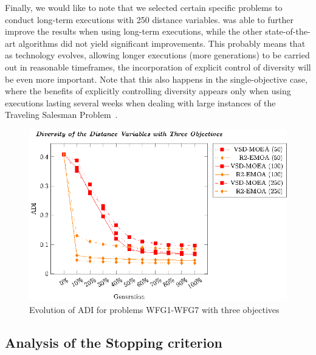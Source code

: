 Finally, we would like to note that we selected certain specific problems to conduct long-term executions with 250 distance variables.
%
\VSDMOEA{} was able to further improve the results when using long-term executions, while the other state-of-the-art algorithms did not yield significant improvements.
%
This probably means that as technology evolves, allowing longer executions (more generations) to be carried out in reasonable timeframes,
the incorporation of explicit control of diversity will be even more important.
%
Note that this also happens in the single-objective case, where the benefits of explicitly controlling diversity appears only when using executions lasting
several weeks when dealing with large instances of the Traveling Salesman Problem~\cite{segura2015novel}.
%

\begin{figure}[t]
\centering
\includegraphics[scale=0.85]{Images/Graphic-Diversity_3obj_tikz-figure1.eps}
\caption{Evolution of ADI for problems WFG1-WFG7 with three objectives}\label{fig:Diversity_3obj}
\end{figure}

\subsection{Analysis of the Stopping criterion}

